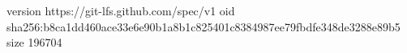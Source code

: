 version https://git-lfs.github.com/spec/v1
oid sha256:b8ca1dd460ace33e6e90b1a8b1c825401c8384987ee79fbdfe348de3288e89b5
size 196704
